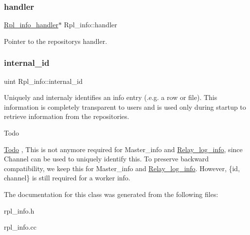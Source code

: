 \subsubsection{\texorpdfstring{handler}{handler}}
{\footnotesize\ttfamily \mbox{\hyperlink{classRpl__info__handler}{Rpl\+\_\+info\+\_\+handler}}$\ast$ Rpl\+\_\+info\+::handler\hspace{0.3cm}{\ttfamily [protected]}}

Pointer to the repository\textquotesingle{}s handler. \mbox{\label{classRpl__info_a409b8a0921617ffd71e40977be694eef}} 
\subsubsection{\texorpdfstring{internal\+\_\+id}{internal\_id}}
{\footnotesize\ttfamily uint Rpl\+\_\+info\+::internal\+\_\+id\hspace{0.3cm}{\ttfamily [protected]}}

Uniquely and internaly identifies an info entry (.e.\+g. a row or file). This information is completely transparent to users and is used only during startup to retrieve information from the repositories.

\begin{DoxyRefDesc}{Todo}
\item[\mbox{\hyperlink{todo__todo000061}{Todo}}], This is not anymore required for Master\+\_\+info and \mbox{\hyperlink{classRelay__log__info}{Relay\+\_\+log\+\_\+info}}, since Channel can be used to uniquely identify this. To preserve backward compatibility, we keep this for Master\+\_\+info and \mbox{\hyperlink{classRelay__log__info}{Relay\+\_\+log\+\_\+info}}. However, \{id, channel\} is still required for a worker info. \end{DoxyRefDesc}


The documentation for this class was generated from the following files\+:\begin{DoxyCompactItemize}
\item 
rpl\+\_\+info.\+h\item 
rpl\+\_\+info.\+cc\end{DoxyCompactItemize}
